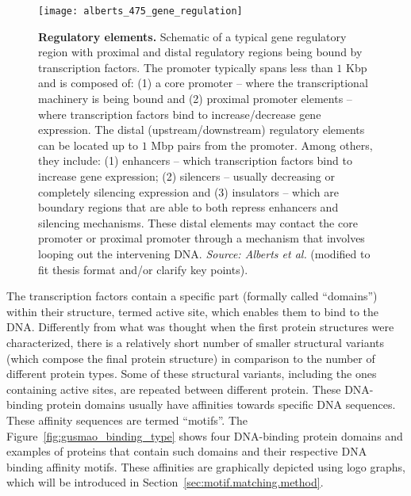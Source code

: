 \begin{figure}[h!]
\centering
\texttt{[image: alberts\_475\_gene\_regulation]}
\caption[Regulatory elements]{\textbf{Regulatory elements.} Schematic of a typical gene regulatory region with proximal and distal regulatory regions being bound by transcription factors. The promoter typically spans less than $1$ Kbp and is composed of: (1) a core promoter -- where the transcriptional machinery is being bound and (2) proximal promoter elements -- where transcription factors bind to increase/decrease gene expression. The distal (upstream/downstream) regulatory elements can be located up to $1$ Mbp pairs from the promoter. Among others, they include: (1) enhancers -- which transcription factors bind to increase gene expression; (2) silencers -- usually decreasing or completely silencing expression and (3) insulators -- which are boundary regions that are able to both repress enhancers and silencing mechanisms. These distal elements may contact the core promoter or proximal promoter through a mechanism that involves looping out the intervening DNA. \emph{Source: Alberts et al.}\cite{alberts2007} (modified to fit thesis format and/or clarify key points).}
\label{fig:alberts_gene_regulation}
\end{figure}

The transcription factors contain a specific part (formally called ``domains'') within their structure, termed active site, which enables them to bind to the DNA. Differently from what was thought when the first protein structures were characterized, there is a relatively short number of smaller structural variants (which compose the final protein structure) in comparison to the number of different protein types. Some of these structural variants, including the ones containing active sites, are repeated between different protein. These DNA-binding protein domains usually have affinities towards specific DNA sequences. These affinity sequences are termed ``motifs''. The Figure~\ref{fig:gusmao_binding_type} shows four DNA-binding protein domains and examples of proteins that contain such domains and their respective DNA binding affinity motifs. These affinities are graphically depicted using logo graphs, which will be introduced in Section~\ref{sec:motif.matching.method}.

